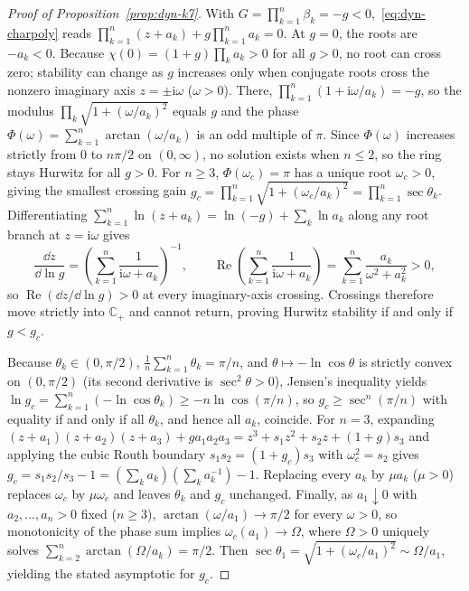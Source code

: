 \begin{proof}[Proof of Proposition~{\upshape\ref{prop:dyn-k7}}]
With $G = \prod_{k=1}^n \beta_k = -g < 0$,~\eqref{eq:dyn-charpoly} reads $\prod_{k=1}^n (z + a_k) + g\prod_{k=1}^n a_k = 0$. At $g = 0$, the roots are $-a_k < 0$. Because $\chi(0) = (1 + g)\prod_k a_k > 0$ for all $g > 0$, no root can cross zero; stability can change as $g$ increases only when conjugate roots cross the nonzero imaginary axis $z = \pm \mathrm{i}\omega$ ($\omega > 0$). There, $\prod_{k=1}^n (1 + \mathrm{i}\omega/a_k) = -g$, so the modulus $\prod_k \sqrt{1 + (\omega/a_k)^2}$ equals $g$ and the phase $\Phi(\omega) = \sum_{k=1}^n \arctan(\omega/a_k)$ is an odd multiple of $\pi$. Since $\Phi(\omega)$ increases strictly from $0$ to $n\pi/2$ on $(0, \infty)$, no solution exists when $n \le 2$, so the ring stays Hurwitz for all $g > 0$. For $n \ge 3$, $\Phi(\omega_c) = \pi$ has a unique root $\omega_c > 0$, giving the smallest crossing gain $g_c = \prod_{k=1}^n \sqrt{1 + (\omega_c/a_k)^2} = \prod_{k=1}^n \sec\theta_k$. Differentiating $\sum_{k=1}^n \ln(z + a_k) = \ln(-g) + \sum_k \ln a_k$ along any root branch at $z = \mathrm{i}\omega$ gives
\[
\frac{\dd z}{\dd\ln g} = \left(\sum_{k=1}^n \frac{1}{\mathrm{i}\omega + a_k}\right)^{-1}, \qquad \operatorname{Re}\left(\sum_{k=1}^n \frac{1}{\mathrm{i}\omega + a_k}\right) = \sum_{k=1}^n \frac{a_k}{\omega^2 + a_k^2} > 0,
\]
so $\operatorname{Re}(\dd z/\dd\ln g) > 0$ at every imaginary-axis crossing. Crossings therefore move strictly into $\mathbb{C}_+$ and cannot return, proving Hurwitz stability if and only if $g < g_c$.

Because $\theta_k \in (0, \pi/2)$, $\frac{1}{n}\sum_{k=1}^n \theta_k = \pi/n$, and $\theta \mapsto -\ln\cos\theta$ is strictly convex on $(0, \pi/2)$ (its second derivative is $\sec^2\theta > 0$), Jensen's inequality yields $\ln g_c = \sum_{k=1}^n (-\ln\cos\theta_k) \ge -n\ln\cos(\pi/n)$, so $g_c \ge \sec^n(\pi/n)$ with equality if and only if all $\theta_k$, and hence all $a_k$, coincide. For $n = 3$, expanding $(z + a_1)(z + a_2)(z + a_3) + g a_1 a_2 a_3 = z^3 + s_1 z^2 + s_2 z + (1 + g)s_3$ and applying the cubic Routh boundary $s_1 s_2 = (1 + g_c)s_3$ with $\omega_c^2 = s_2$ gives $g_c = s_1 s_2/s_3 - 1 = (\sum_k a_k)(\sum_k a_k^{-1}) - 1$. Replacing every $a_k$ by $\mu a_k$ ($\mu > 0$) replaces $\omega_c$ by $\mu\omega_c$ and leaves $\theta_k$ and $g_c$ unchanged. Finally, as $a_1 \downarrow 0$ with $a_2, \dots, a_n > 0$ fixed ($n \ge 3$), $\arctan(\omega/a_1) \to \pi/2$ for every $\omega > 0$, so monotonicity of the phase sum implies $\omega_c(a_1) \to \Omega$, where $\Omega > 0$ uniquely solves $\sum_{k=2}^n \arctan(\Omega/a_k) = \pi/2$. Then $\sec\theta_1 = \sqrt{1 + (\omega_c/a_1)^2} \sim \Omega/a_1$, yielding the stated asymptotic for $g_c$.
\end{proof}

